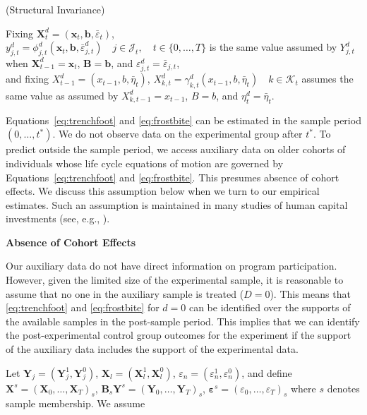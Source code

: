 \begin{assumption}\label{ass:butts}
(Structural Invariance)\\
\begin{spacing}{1.5}
\noindent Fixing $\bm{X}^d_t = (\bm{x}_t, \bm{b},\bar{\varepsilon}_t)$,\\
$y^d_{j,t} = \phi^d_{j,t} (\bm{x}_t, \bm{b},  \bar{\varepsilon}^d_{j,t}) \quad j \in \mathcal{J}_t, \quad t \in \{0,\ldots,T\}$ is the same value assumed by $Y^d_{j,t}$ when $\bm{X}^d_{t-1} = \bm{x}_t$, $\bm{B} = \bm{b}$, and $\varepsilon^d_{j,t} = \bar{\varepsilon}_{j,t}$,\\
and fixing $X^d_{t-1} = (x_{t-1}, b, \bar{\eta}_t)$, $X^d_{k,t} = \gamma^d_{k,t} (x_{t-1}, b, \bar{\eta}_t) \quad k \in \mathcal{K}_t$ assumes the same value as assumed by $X^d_{k,t-1} = x_{t-1}$, $B = b$, and $\eta^d_t = \bar{\eta}_t$.
\end{spacing}
\end{assumption}

Equations~\eqref{eq:trenchfoot} and \eqref{eq:frostbite} can be estimated in the sample period $(0,\ldots,t^{*})$. We do not observe data on the experimental group after $t^{*}$. To predict outside the sample period, we access auxiliary data on older cohorts of individuals whose life cycle equations of motion are governed by Equations~\eqref{eq:trenchfoot} and \eqref{eq:frostbite}. This presumes absence of cohort effects. We discuss this assumption below when we turn to our empirical estimates. Such an assumption is maintained in many studies of human capital investments (see, e.g., \citealp{Heckman_Lochner_ea_2006_HEE}).

\begin{assumption}\label{ass:crotchrot}
\textbf{Absence of Cohort Effects}
\end{assumption}

Our auxiliary data do not have direct information on program participation. However, given the limited size of the experimental sample, it is reasonable to assume that no one in the auxiliary sample is treated ($D=0$). This means that \eqref{eq:trenchfoot} and \eqref{eq:frostbite} for $d=0$ can be identified over the supports of the available samples in the post-sample period. This implies that we can identify the post-experimental control group outcomes for the experiment if the support of the auxiliary data includes the support of the experimental data.

Let $\bm{Y}_j = (\bm{Y}^1_j, \bm{Y}^0_j)$, $\bm{X}_l = (\bm{X}^1_l, \bm{X}^0_l)$, $\varepsilon_n = (\varepsilon^1_n, \varepsilon^0_n)$, and define $\bm{X}^s = (\bm{X}_0,\dots,\bm{X}_T)_s$, $\bm{B}_s \bm{Y}^s = (\bm{Y}_0,\dots,\bm{Y}_T)_s$, $\bm{\varepsilon}^s = (\varepsilon_0,\dots,\varepsilon_{T})_s$ where $s$ denotes sample membership. We assume

